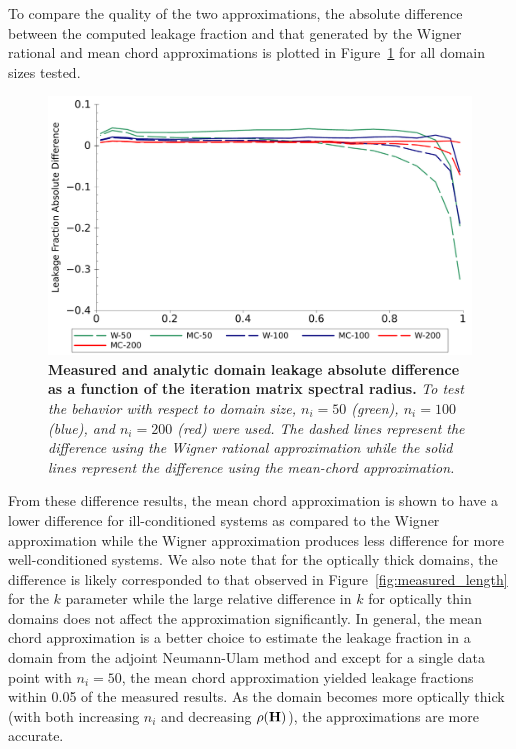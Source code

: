 To compare the quality of the two approximations, the absolute
difference between the computed leakage fraction and that generated by
the Wigner rational and mean chord approximations is plotted in
Figure~\ref{fig:leakage_error} for all domain sizes tested.
\begin{figure}[t!]
  \begin{spacing}{1.0}
    \begin{center}
      \includegraphics[width=6.0in,clip]{chapters/parallel_mc/leakage_error_2.pdf}
    \end{center}
    \caption{\textbf{Measured and analytic domain leakage absolute
        difference as a function of the iteration matrix spectral radius.}
      \textit{To test the behavior with respect to domain size,
        $n_i=50$ (green), $n_i=100$ (blue), and $n_i=200$ (red) were
        used. The dashed lines represent the difference using the Wigner
        rational approximation while the solid lines represent the
        difference using the mean-chord approximation.}}
    \label{fig:leakage_error}
  \end{spacing}
\end{figure}
From these difference results, the mean chord approximation is shown to
have a lower difference for ill-conditioned systems as compared to the
Wigner approximation while the Wigner approximation produces less
difference for more well-conditioned systems. We also note that for the
optically thick domains, the difference is likely corresponded to that
observed in Figure~\ref{fig:measured_length} for the $k$ parameter
while the large relative difference in $k$ for optically thin domains does
not affect the approximation significantly. In general, the mean chord
approximation is a better choice to estimate the leakage fraction in a
domain from the adjoint Neumann-Ulam method and except for a single
data point with $n_i=50$, the mean chord approximation yielded leakage
fractions within 0.05 of the measured results. As the domain becomes
more optically thick (with both increasing $n_i$ and decreasing
$\rho(\mathbf{H})$), the approximations are more accurate.

